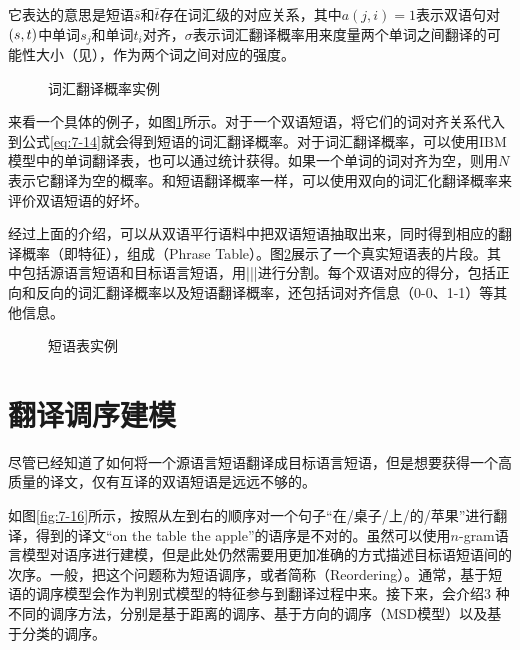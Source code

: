 \parinterval 它表达的意思是短语$\bar{s}$和$\bar{t}$存在词汇级的对应关系，其中$a(j,i)=1$表示双语句对$({s},{t})$中单词$s_j$和单词$t_i$对齐，$\sigma $表示词汇翻译概率用来度量两个单词之间翻译的可能性大小（见{\chapterfive}），作为两个词之间对应的强度。

\begin{figure}[htp]
\centering

\caption{词汇翻译概率实例}
\label{fig:7-14}
\end{figure}

\parinterval 来看一个具体的例子，如图\ref{fig:7-14}所示。对于一个双语短语，将它们的词对齐关系代入到公式\eqref{eq:7-14}就会得到短语的词汇翻译概率。对于词汇翻译概率，可以使用IBM 模型中的单词翻译表，也可以通过统计获得。如果一个单词的词对齐为空，则用$N$表示它翻译为空的概率。和短语翻译概率一样，可以使用双向的词汇化翻译概率来评价双语短语的好坏。

\parinterval 经过上面的介绍，可以从双语平行语料中把双语短语抽取出来，同时得到相应的翻译概率（即特征），组成{\small{}}（Phrase Table）。图\ref{fig:7-15}展示了一个真实短语表的片段。其中包括源语言短语和目标语言短语，用|||进行分割。每个双语对应的得分，包括正向和反向的词汇翻译概率以及短语翻译概率，还包括词对齐信息（0-0、1-1）等其他信息。

\begin{figure}[htp]
\centering

\caption{短语表实例}
\label{fig:7-15}
\end{figure}

\sectionnewpage
\section{翻译调序建模}\label{subsection-7.4}

\parinterval 尽管已经知道了如何将一个源语言短语翻译成目标语言短语，但是想要获得一个高质量的译文，仅有互译的双语短语是远远不够的。

\parinterval 如图\ref{fig:7-16}所示，按照从左到右的顺序对一个句子“在/桌子/上/的/苹果”进行翻译，得到的译文“on the table the apple”的语序是不对的。虽然可以使用$n$-gram语言模型对语序进行建模，但是此处仍然需要用更加准确的方式描述目标语短语间的次序。一般，把这个问题称为短语调序，或者简称{\small{}}（Reordering）。通常，基于短语的调序模型会作为判别式模型的特征参与到翻译过程中来。接下来，会介绍3 种不同的调序方法，分别是基于距离的调序、基于方向的调序（MSD模型）以及基于分类的调序。

